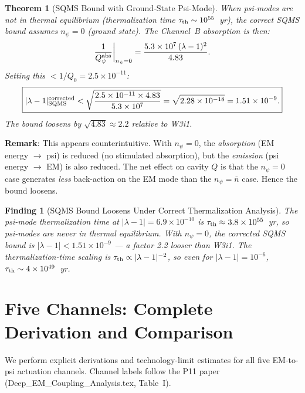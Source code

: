 \documentclass[11pt,twocolumn]{article}
\newcommand{\lam}{\lambda}
\newcommand{\tauth}{\tau_{\rm th}}
\newcommand{\nbar}{\bar{n}}
\newtheorem{theorem}{Theorem}
\newtheorem{finding}{Finding}
\begin{document}
\begin{theorem}[SQMS Bound with Ground-State Psi-Mode]
\label{thm:sqms_corrected}
When psi-modes are not in thermal equilibrium (thermalization time
$\tauth \sim 10^{55}$~yr), the correct SQMS bound assumes $n_\psi = 0$
(ground state). The Channel~B absorption is then:
\begin{equation}
\frac{1}{Q_\psi^{\rm abs}}\bigg|_{n_\psi=0}
= \frac{5.3\times10^7\,(\lam-1)^2}{4.83}.
\end{equation}
Setting this $< 1/Q_0 = 2.5\times10^{-11}$:
\begin{equation}
\boxed{
|\lam-1|_{\rm SQMS}^{\rm corrected} <
\sqrt{\frac{2.5\times10^{-11}\times4.83}{5.3\times10^7}}
= \sqrt{2.28\times10^{-18}} = 1.51\times10^{-9}.
}
\label{eq:sqms_ground_state}
\end{equation}
The bound \emph{loosens} by $\sqrt{4.83} \approx 2.2$ relative to W3i1.
\end{theorem}

\textbf{Remark}: This appears counterintuitive. With $n_\psi = 0$, the
\emph{absorption} (EM energy $\to$ psi) is reduced (no stimulated absorption),
but the \emph{emission} (psi energy $\to$ EM) is also reduced. The net effect
on cavity $Q$ is that the $n_\psi = 0$ case generates \emph{less} back-action
on the EM mode than the $n_\psi = \nbar$ case. Hence the bound loosens.

\begin{finding}[SQMS Bound Loosens Under Correct Thermalization Analysis]
\label{find:thermalization}
The psi-mode thermalization time at $|\lam-1| = 6.9\times10^{-10}$ is
$\tauth \approx 3.8\times10^{55}$~yr, so psi-modes are never in thermal
equilibrium. With $n_\psi = 0$, the corrected SQMS bound is
$|\lam-1| < 1.51\times10^{-9}$ --- a factor 2.2 looser than W3i1.
The thermalization-time scaling is $\tauth \propto |\lam-1|^{-2}$,
so even for $|\lam-1| = 10^{-6}$, $\tauth \sim 4\times10^{49}$~yr.
\end{finding}


\section{Five Channels: Complete Derivation and Comparison}
\label{sec:five_channels}

We perform explicit derivations and technology-limit estimates for all five
EM-to-psi actuation channels. Channel labels follow the P11 paper
(Deep\_EM\_Coupling\_Analysis.tex, Table~I).
\end{document}
